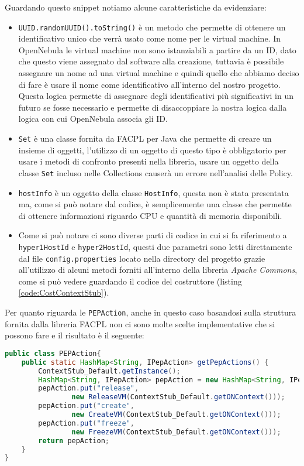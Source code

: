 Guardando questo snippet notiamo alcune caratteristiche da evidenziare:\\
\begin{itemize}
    \item \texttt{UUID.randomUUID().toString()} è un metodo che permette di ottenere un identificativo unico che verrà usato come nome per le virtual machine. In OpenNebula le virtual machine non sono istanziabili a partire da un ID, dato che questo viene assegnato dal software alla creazione, tuttavia è possibile assegnare un nome ad una virtual machine e quindi quello che abbiamo deciso di fare è usare il nome come identificativo all'interno del nostro progetto. Questa logica permette di assegnare degli identificativi più significativi in un futuro se fosse necessario e permette di disaccoppiare la nostra logica dalla logica con cui OpenNebula associa gli ID.
    \item \texttt{Set} è una classe fornita da FACPL per Java che permette di creare un insieme di oggetti, l'utilizzo di un oggetto di questo tipo è obbligatorio per usare i metodi di confronto presenti nella libreria, usare un oggetto della classe \texttt{Set} incluso nelle Collections causerà un errore nell'analisi delle Policy.
    \item \texttt{hostInfo} è un oggetto della classe \texttt{HostInfo}, questa non è stata presentata ma, come si può notare dal codice, è semplicemente una classe che permette di ottenere informazioni riguardo CPU e quantità di memoria disponibili.
    \item Come si può notare ci sono diverse parti di codice in cui si fa riferimento a \texttt{hyper1HostId} e \texttt{hyper2HostId}, questi due parametri sono letti direttamente dal file \texttt{config.properties} locato nella directory del progetto grazie all'utilizzo di alcuni metodi forniti all'interno della libreria \emph{Apache Commons}\cite{apache_commons}, come si può vedere guardando il codice del costruttore (listing \ref{code:CostContextStub}).
\end{itemize}

Per quanto riguarda le \texttt{PEPAction}, anche in questo caso basandosi sulla struttura fornita dalla libreria FACPL non ci sono molte scelte implementative che si possono fare e il risultato è il seguente:
\begin{lstlisting}[language=Java, caption=Classe PEPAction adattata, label=code:PEPAction]
public class PEPAction{
    public static HashMap<String, IPepAction> getPepActions() {
        ContextStub_Default.getInstance();
        HashMap<String, IPepAction> pepAction = new HashMap<String, IPepAction>();
        pepAction.put("release", 
                new ReleaseVM(ContextStub_Default.getONContext()));
        pepAction.put("create", 
                new CreateVM(ContextStub_Default.getONContext()));
        pepAction.put("freeze", 
                new FreezeVM(ContextStub_Default.getONContext()));
        return pepAction;
    }
}
\end{lstlisting}

